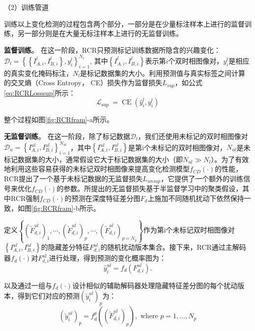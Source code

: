 \documentclass[lang=chs, degree=master, blindreview=false, adobe=false]{yanputhesis}
\begin{document}
（2）训练管道

训练以上变化检测的过程包含两个部分，一部分是在少量标注样本上进行的监督训练，另一部分则是在大量无标注样本上进行的无监督训练。

\textbf{监督训练}。
在这一阶段，RCR只预测标记训练数据所隐含的兴趣变化：$\mathcal{D}_{l}=\left\{\left\{I_{A, i}^{l}, I_{B, i}^{l}\right\}, y_{i}^{l}\right\}_{i=1}^{N_{l}}$, 其中$\left\{I_{A, i}^{l}, I_{B, i}^{l}\right\}$表示第$i$个双时相图像对，$y_{i}^{l}$是相应的真实变化掩码标注，${N_{l}}$是标记数据集的大小。利用预测值与真实标签之间计算的交叉熵（Cross Entropy， CE）损失\cite{murphy2012CE}作为监督损失$L_{sup}$，如公式\ref{eq:RCRLosssup}所示：
\begin{equation}
  \label{eq:RCRLosssup}
  \mathcal{L}_{\text {sup }}=\operatorname{CE}\left(\hat{y}_{i}^{l}, y_{i}^{l}\right)
\end{equation}

整个过程如图\ref{fig:RCRfram}-a所示。

\textbf{无监督训练}。
在这一阶段，除了标记数据$\mathcal{D}_{l}$，我们还使用未标记的双时相图像对$\mathcal{D}_{u}=\left\{I_{A, i}^{ul}, I_{B, i}^{ul}\right\}_{i=1}^{N_{ul}}$，其中$\left\{I_{A, i}^{ul}, I_{B, i}^{ul}\right\}$是第i个未标记的双时相图像对，$N_{ul}$是未标记数据集的大小，通常假设它大于标记数据集的大小（即$N_{u l} \gg N_{l}$）。为了有效地利用这些容易获得的未标记双时相图像来提高变化检测模型$f_{C D}(\cdot)$的性能，RCR提出了一个基于未标记数据的无监督损失$L_{unsup}$，它提供了一个额外的训练信号来优化$f_{C D}(\cdot)$的参数。所提出的无监督损失基于半监督学习中的聚类假设，其中RCR强制$f_{C D}(\cdot)$的预测在深度特征差分图$F_d$上施加不同随机扰动下依然保持一致，如图\ref{fig:RCRfram}-b所示。

定义$\left\{\left(\widetilde{F}_{d, i}^{u l}\right)_{1}, \cdots,\left(\widetilde{F}_{d, i}^{u l}\right)_{p}, \cdots,\left(\widetilde{F}_{d, i}^{u l}\right)_{p=N_{p}}\right\}$作为第i个未标记双时相图像对$\left\{I_{A, i}^{ul}, I_{B, i}^{ul}\right\}$的隐藏差分特征$F_{d, i}^{u l}$的随机扰动版本集合。接下来，RCR通过主解码器$f_d(\cdot)$对$F_{d, i}^{u l}$进行处理，得到预测的变化概率图为：
\begin{equation}
  \label{eq:RCRpredict}
  \hat{y}_{i}^{u l}=f_{d}\left(F_{d, i}^{u l}\right) .
\end{equation}

以及通过一组与$f_d(\cdot)$设计相似的辅助解码器处理隐藏特征差分图的每个扰动版本，得到它们对应的预测$\left(\widetilde{y}_{i}^{u l}\right)_{p}$为：
\begin{equation}
  \label{eq:RCRauxpredict}
  \left(\widetilde{y}_{i}^{u l}\right)_{p}=f_{d}^{p}\left(\left(\widetilde{F}_{d, i}^{u l}\right)_{p}\right), \text { where } p=1, \ldots, N_{p}
\end{equation}
\end{document}
